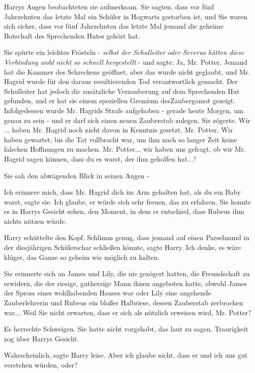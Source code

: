 Harrys Augen beobachteten sie aufmerksam. \glqq Sie sagten, dass vor fünf
Jahrzehnten das letzte Mal ein Schüler in Hogwarts gestorben ist, und Sie waren
sich sicher, dass vor fünf Jahrzehnten das letzte Mal jemand die geheime
Botschaft des Sprechenden Hutes gehört hat.\grqq{}

Sie spürte ein leichtes Frösteln - \emph{selbst der Schulleiter oder Severus
hätten diese Verbindung wohl nicht so schnell hergestellt} - und sagte: \glqq
Ja, Mr. Potter. Jemand hat die Kammer des Schreckens geöffnet, aber das wurde
nicht geglaubt, und Mr. Hagrid wurde für den daraus resultierenden Tod
verantwortlich gemacht. Der Schulleiter hat jedoch die zusätzliche Verzauberung
auf dem Sprechenden Hut gefunden, und er hat sie einem speziellen Gremium
desZaubergamot gezeigt. Infolgedessen wurde Mr. Hagrids Strafe aufgehoben -
gerade heute Morgen, um genau zu sein - und er darf sich einen neuen Zauberstab
zulegen.\grqq{} Sie zögerte. \glqq Wir ... haben Mr. Hagrid noch nicht davon in
Kenntnis gesetzt, Mr. Potter. Wir haben gewartet, bis die Tat vollbracht war, um
ihm nach so langer Zeit keine falschen Hoffnungen zu machen. Mr. Potter... wir
haben uns gefragt, ob wir Mr. Hagrid sagen können, dass du es warst, der ihm
geholfen hat...?\grqq{}

Sie sah den abwägenden Blick in seinen Augen -

\glqq Ich erinnere mich, dass Mr. Hagrid dich im Arm gehalten hat, als du ein
Baby warst\grqq{}, sagte sie. \glqq Ich glaube, er würde sich sehr freuen, das
zu erfahren.\grqq{} Sie konnte es in Harrys Gesicht sehen, den Moment, in dem er
entschied, dass Rubeus ihm nichts nützen würde.

Harry schüttelte den Kopf. \glqq Schlimm genug, dass jemand auf einen Parselmund
in der diesjährigen Schülerschar schließen könnte\grqq{}, sagte Harry. \glqq Ich
denke, es wäre klüger, das Ganze so geheim wie möglich zu halten.\grqq{}

Sie erinnerte sich an James und Lily, die nie gezögert hatten, die Freundschaft
zu erwidern, die der riesige, gutherzige Mann ihnen angeboten hatte, obwohl
James der Spross eines wohlhabenden Hauses war oder Lily eine angehende
Zauberlehrerin und Rubeus ein bloßer Halbriese, dessen Zauberstab zerbrochen
war... \glqq Weil Sie nicht erwarten, dass er sich als nützlich erweisen wird,
Mr. Potter?\grqq{}

Es herrschte Schweigen. Sie hatte nicht vorgehabt, das laut zu sagen.
Traurigkeit zog über Harrys Gesicht.

\glqq Wahrscheinlich\grqq{}, sagte Harry leise. \glqq Aber ich glaube nicht,
dass er und ich uns gut verstehen würden, oder?\grqq{}

